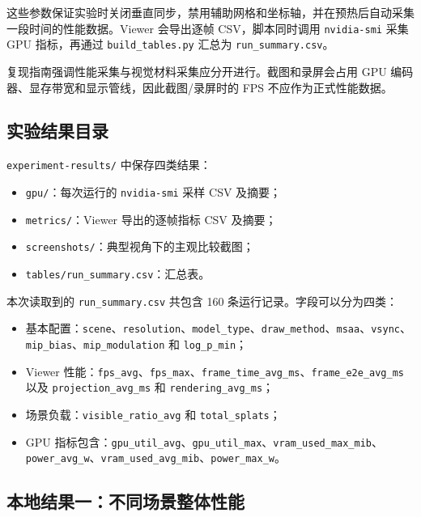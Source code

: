 \documentclass[12pt,hyperref,a4paper,UTF8]{ctexart}
\begin{document}
这些参数保证实验时关闭垂直同步，禁用辅助网格和坐标轴，并在预热后自动采集一段时间的性能数据。Viewer 会导出逐帧 CSV，脚本同时调用 \texttt{nvidia-smi} 采集 GPU 指标，再通过 \texttt{build\_tables.py} 汇总为 \texttt{run\_summary.csv}。

复现指南强调性能采集与视觉材料采集应分开进行。截图和录屏会占用 GPU 编码器、显存带宽和显示管线，因此截图/录屏时的 FPS 不应作为正式性能数据。



\subsection{实验结果目录}
\texttt{experiment-results/} 中保存四类结果：

\begin{itemize}
    \item \texttt{gpu/}：每次运行的 \texttt{nvidia-smi} 采样 CSV 及摘要；
    \item \texttt{metrics/}：Viewer 导出的逐帧指标 CSV 及摘要；
    \item \texttt{screenshots/}：典型视角下的主观比较截图；
    \item \texttt{tables/run\_summary.csv}：汇总表。
\end{itemize}

本次读取到的 \texttt{run\_summary.csv} 共包含 160 条运行记录。字段可以分为四类：

\begin{itemize}
    \item 基本配置：\texttt{scene}、\texttt{resolution}、\texttt{model\_type}、\texttt{draw\_method}、\texttt{msaa}、\texttt{vsync}、\texttt{mip\_bias}、\texttt{mip\_modulation} 和 \texttt{log\_p\_min}；
    \item Viewer 性能：\texttt{fps\_avg}、\texttt{fps\_max}、\texttt{frame\_time\_avg\_ms}、\texttt{frame\_e2e\_avg\_ms} 以及 \texttt{projection\_avg\_ms} 和 \texttt{rendering\_avg\_ms}；
    \item 场景负载：\texttt{visible\_ratio\_avg} 和 \texttt{total\_splats}；
    \item GPU 指标包含：\texttt{gpu\_util\_avg}、\texttt{gpu\_util\_max}、\texttt{vram\_used\_max\_mib}、\texttt{power\_avg\_w}、\texttt{vram\_used\_avg\_mib}、\texttt{power\_max\_w}。
\end{itemize}



\subsection{本地结果一：不同场景整体性能}
\end{document}
